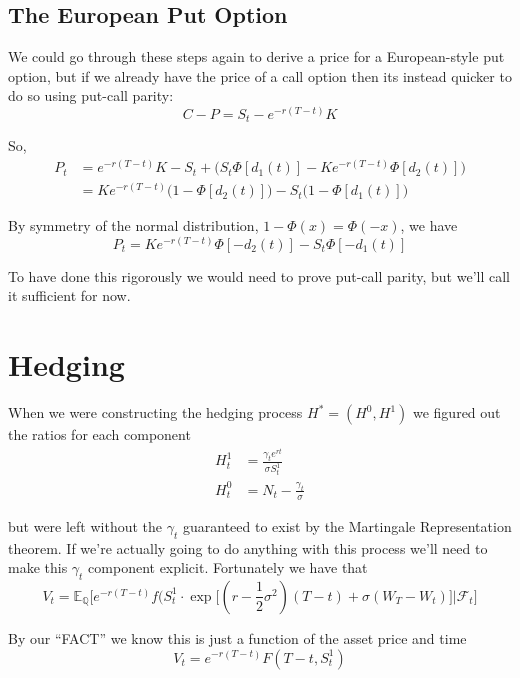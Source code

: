 \documentclass[12pt]{article}
\newlength\tindent
\renewcommand{\indent}{\hspace*{\tindent}}
\begin{document}
\subsection{The European Put Option}

\indent We could go through these steps again to derive a price for a European-style put option, but if we already have the price of a call option then its instead quicker to do so using put-call parity:
\begin{equation*}
	C - P = S_t - e^{-r(T - t)}K
\end{equation*}

So,
\begin{align*}
	P_t &= e^{-r(T - t)}K - S_t + \Big(S_t\Phi[d_1(t)] - Ke^{-r(T - t)}\Phi[d_2(t)]\Big) \\
		&= Ke^{-r(T - t)}\big(1 - \Phi[d_2(t)]\big) - S_t\big(1 - \Phi[d_1(t)]\big)
\end{align*}

By symmetry of the normal distribution, $1 - \Phi(x) = \Phi(-x)$, we have
\begin{equation*}
	P_t = Ke^{-r(T - t)}\Phi[-d_2(t)] - S_t\Phi[-d_1(t)]
\end{equation*}

To have done this rigorously we would need to prove put-call parity, but we'll call it sufficient for now.

\section{Hedging}

\indent When we were constructing the hedging process $H^* = (H^0, H^1)$ we figured out the ratios for each component
\begin{align*}
	H^1_t &= \frac{\gamma_te^{rt}}{\sigma S^1_t} \\
	H^0_t &= N_t - \frac{\gamma_t}{\sigma}
\end{align*}

but were left without the $\gamma_t$ guaranteed to exist by the Martingale Representation theorem. If we're actually going to do anything with this process we'll need to make this $\gamma_t$ component explicit. Fortunately we have that
\begin{equation*}
	V_t = \mathbb E_{\mathbb Q}\Big[e^{-r(T - t)}f(S^1_t\cdot\exp{\big[(r - \frac{1}{2}\sigma^2)(T - t) + \sigma(W_T - W_t)\big]} \Big| \mathcal F_t \Big]
\end{equation*}

By our ``FACT'' we know this is just a function of the asset price and time 
\begin{equation*}
	V_t = e^{-r(T - t)}F(T - t, S^1_t)
\end{equation*}
\end{document}

